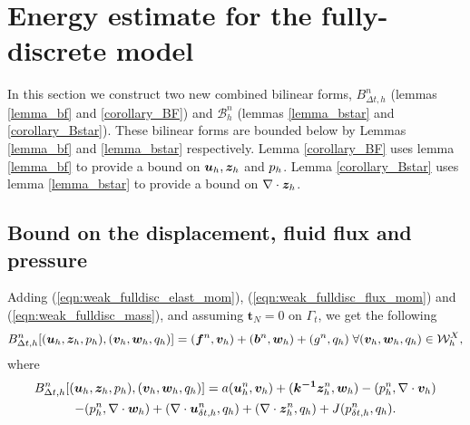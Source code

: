 \section{Energy estimate for the fully-discrete model}
\label{sec:energy}

In this section we construct two new combined bilinear forms, $B^n_{\Delta t,h}$ (lemmas \ref{lemma_bf} and \ref{corollary_BF}) and $\mathcal{B}_{h}^{n}$ (lemmas \ref{lemma_bstar} and \ref{corollary_Bstar}). These bilinear forms are bounded below by Lemmas \ref{lemma_bf} and \ref{lemma_bstar} respectively. Lemma \ref{corollary_BF} uses lemma \ref{lemma_bf} to provide a bound on $\boldsymbol{u}_{h}, \boldsymbol{z}_{h}$ and $p_h$. Lemma \ref{corollary_Bstar} uses lemma \ref{lemma_bstar} to provide a bound on $\nabla \cdot \boldsymbol{z}_{h}$.


\subsection{Bound on the displacement, fluid flux and pressure}
\label{sec:linear_form_one}
Adding (\ref{eqn:weak_fulldisc_elast_mom}), (\ref{eqn:weak_fulldisc_flux_mom}) and (\ref{eqn:weak_fulldisc_mass}), and assuming
$\mathbf{t}_{N}=0$ on $\Gamma_{t}$, we get the following
\begin{equation}
\label{eqn:B_weakform}
B_{\Delta t,h}^{n}[(\boldsymbol{u}_{h},\boldsymbol{z}_{h},p_h),(\boldsymbol{v}_{h},\boldsymbol{w}_{h},{q}_{h})] =  (\boldsymbol{f}^{n},\boldsymbol{v}_{h}) +  (\boldsymbol{b}^{n},\boldsymbol{w}_{h})    +(g^{n},{q}_{h}) \; \forall (\boldsymbol{v}_{h},\boldsymbol{w}_{h},{q}_{h}) \in \mathcal{W}^{X}_{h},
\end{equation}
where
\begin{multline}
B_{\Delta t,h}^{n}[(\boldsymbol{u}_{h},\boldsymbol{z}_{h},p_h),(\boldsymbol{v}_{h},\boldsymbol{w}_{h},{q}_{h})]  =   a(\boldsymbol{u}_{h}^{n},\boldsymbol{v}_{h})+   (\boldsymbol{k^{-1}} \boldsymbol{z}_{h}^{n}, \boldsymbol{w}_{h}) -   (p_h^{n}, \nabla \cdot \boldsymbol{v}_{h})  \\-  (p_h^{n}, \nabla \cdot \boldsymbol{w}_{h}) 
  + (\nabla \cdot{\boldsymbol{u}_{\delta t,h}^{n}},{q}_{h}) +  ( \nabla \cdot \boldsymbol{z}_{h}^{n}, {q}_{h}) + J({{p}_{\delta t,h}^{n}},{q}_{h}).
\label{eqn:BF}
\end{multline}

